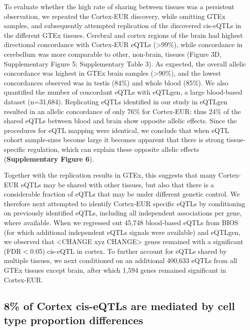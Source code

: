 To evaluate whether the high rate of sharing between tissues was a persistent observation, we repeated the Cortex-EUR discovery, while omitting GTEx samples, and subsequently attempted replication of the discovered cis-eQTLs in the different GTEx tissues\cite{consortiumGTExConsortiumAtlas2020}. Cerebral and cortex regions of the brain had highest directional concordance with Cortex-EUR eQTLs (>99\%), while concordance in cerebellum was more comparable to other, non-brain, tissues (Figure 3D, Supplementary Figure 5; Supplementary Table 3). As expected, the overall allelic concordance was highest in GTEx brain samples (>90\%), and the lowest concordances observed was in testis (84\%) and whole blood (85\%). We also quantified the number of concordant eQTLs with eQTLgen, a large blood-based dataset (n=31,684). Replicating eQTLs identified in our study in eQTLgen resulted in an allelic concordance of only 76\% for Cortex-EUR: thus 24\% of the shared eQTLs between blood and brain show opposite allelic effects. Since the procedures for eQTL mapping were identical, we conclude that when eQTL cohort sample-sizes become large it becomes apparent that there is strong tissue-specific regulation, which can explain these opposite allelic effects\cite{fuUnravelingRegulatoryMechanisms2012} (\textbf{Supplementary Figure 6}). 

Together with the replication results in GTEx, this suggests that many Cortex-EUR eQTLs may be shared with other tissues, but also that there is a considerable fraction of eQTLs that may be under different genetic control. We therefore next attempted to identify Cortex-EUR specific eQTLs by conditioning on previously identified eQTLs, including all independent associations per gene, where available. When we regressed out 45,748 blood-based eQTLs from BIOS\cite{zhernakovaIdentificationContextdependentExpression2017} (for which additional independent eQTLs signals were available) and eQTLgen, we observed that <CHANGE xyz CHANGE> genes remained with a significant (FDR$<$0.05) cis-eQTL in cortex. To further account for eQTLs shared by multiple tissues, we next conditioned on an additional 400,633 eQTLs from all GTEx tissues except brain, after which 1,594 genes remained significant in Cortex-EUR.

\subsection{8\% of Cortex cis-eQTLs are mediated by cell type proportion differences}
	
